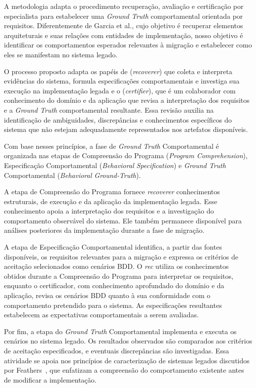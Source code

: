A metodologia adapta o procedimento recuperação, avaliação e certificação por especialista para estabelecer uma \textit{Ground Truth} comportamental orientada por requisitos. Diferentemente de Garcia et al., cujo objetivo é recuperar elementos arquiteturais e suas relações com entidades de implementação, nosso objetivo é identificar os comportamentos esperados relevantes à migração e estabelecer como eles se manifestam no sistema legado.

O processo proposto adapta os papéis de (\textit{recoverer}) que coleta e interpreta evidências do sistema, formula especificações comportamentais e investiga sua execução na implementação legada e o (\textit{certifier}), que é um colaborador com conhecimento do domínio e da aplicação que revisa a interpretação dos requisitos e a \textit{Ground Truth} comportamental resultante. Essa revisão auxilia na identificação de ambiguidades, discrepâncias e conhecimentos específicos do sistema que não estejam adequadamente representados nos artefatos disponíveis.

Com base nesses princípios, a fase de \textit{Ground Truth} Comportamental é organizada nas etapas de Compreensão do Programa (\textit{Program Comprehension}), Especificação Comportamental (\textit{Behavioral Specification}) e \textit{Ground Truth} Comportamental (\textit{Behavioral Ground-Truth}).

A etapa de Compreensão do Programa fornece \textit{recoverer} conhecimentos estruturais, de execução e da aplicação da implementação legada. Esse conhecimento apoia a interpretação dos requisitos e a investigação do comportamento observável do sistema. Ele também permanece disponível para análises posteriores da implementação durante a fase de migração.

A etapa de Especificação Comportamental identifica, a partir das fontes disponíveis, os requisitos relevantes para a migração e expressa os critérios de aceitação selecionados como cenários BDD. O \textit{rec} utiliza os conhecimentos obtidos durante a Compreensão do Programa para interpretar os requisitos, enquanto o certificador, com conhecimento aprofundado do domínio e da aplicação, revisa os cenários BDD quanto à sua conformidade com o comportamento pretendido para o sistema. As especificações resultantes estabelecem as expectativas comportamentais a serem avaliadas.

Por fim, a etapa do \textit{Ground Truth} Comportamental implementa e executa os cenários no sistema legado. Os resultados observados são comparados aos critérios de aceitação especificados, e eventuais discrepâncias são investigadas. Essa atividade se apoia nos princípios de caracterização de sistemas legados discutidos por Feathers~\cite{Feathers2004}, que enfatizam a compreensão do comportamento existente antes de modificar a implementação.


